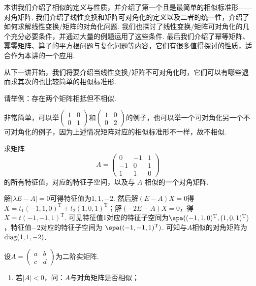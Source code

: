 \begin{summary}

    本讲我们介绍了相似的定义与性质，并介绍了第一个且是最简单的相似标准形——对角矩阵. 我们介绍了线性变换和矩阵可对角化的定义以及二者的统一性，介绍了如何求解线性变换/矩阵的对角化问题. 我们也探讨了线性变换/矩阵可对角化的几个充分必要条件，并通过大量的例题运用了这些条件. 最后我们介绍了幂等矩阵、幂零矩阵、算子的平方根问题与复化问题等内容，它们有很多值得探讨的性质，适合作为本讲的一个应用.

    从下一讲开始，我们将要介绍当线性变换/矩阵不可对角化时，它们可以有哪些退而求其次的也比较简单的相似标准形.

\end{summary}

\begin{exercise}

    \begin{exgroup}
        \item 请举例：存在两个矩阵相抵但不相似.
        \begin{answer}
            非常简单，可以举$\begin{pmatrix}
                1 & 0 \\ 0 & 1
            \end{pmatrix}$和$\begin{pmatrix}
                1 & 0 \\ 0 & 2
            \end{pmatrix}$的例子，也可以举一个可对角化另一个不可对角化的例子，因为上述情况矩阵对应的相似标准形不一样，故不相似.
        \end{answer}
        \item 求矩阵
        \[A = \begin{pmatrix}
                0  & -1 & 1 \\
                -1 & 0  & 1 \\
                1  & 1  & 0
            \end{pmatrix}\]
        的所有特征值，对应的特征子空间，以及与 $A$ 相似的一个对角矩阵.
        \begin{answer}
            解$|\lambda E-A|=0$可得特征值为$1,1,-2$. 然后解$(E-A)X=0$得$X=t_1(-1,1,0)^\mathrm{T}+t_2(1,0,1)^\mathrm{T}$；解$(-2E-A)X=0$，得$X=t(-1,-1,1)^\mathrm{T}$. 可见特征值1对应的特征子空间为$\spa((-1,1,0)^\mathrm{T},(1,0,1)^\mathrm{T})$，特征值$-2$对应的特征子空间为 $\spa((-1,-1,1)^\mathrm{T})$. 可知与$A$相似的对角矩阵为 $\operatorname{diag}(1,1,-2)$.
        \end{answer}
        \item 设$A=\begin{pmatrix}
                a & b \\ c & d
            \end{pmatrix}$为二阶实矩阵.
        \begin{enumerate}
            \item 若$|A|<0$，问：$A$与对角矩阵是否相似；


\end{enumerate}
\end{exgroup}
\end{exercise}
